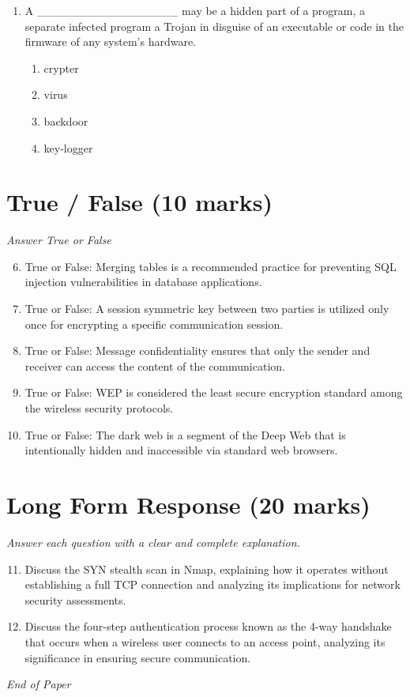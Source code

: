 \documentclass[12pt]{article}
\begin{document}
\begin{enumerate}[label=\arabic*.]
\begin{enumerate}[label=(\alph*)]
    \item buffer checks
\end{enumerate}
\item A \_\_\_\_\_\_\_\_\_\_\_\_\_\_\_\_\_ may be a hidden part of a program, a separate infected program a Trojan in disguise of an executable or code in the firmware of any system's hardware.
\begin{enumerate}[label=(\alph*)]
    \item crypter
    \item virus
    \item backdoor
    \item key-logger
\end{enumerate}
\end{enumerate}

\section*{True / False (10 marks)}
\textit{Answer True or False}
\begin{enumerate}[label=\arabic*.]
\setcounter{enumi}{5}
\item True or False: Merging tables is a recommended practice for preventing SQL injection vulnerabilities in database applications.
\item True or False: A session symmetric key between two parties is utilized only once for encrypting a specific communication session.
\item True or False: Message confidentiality ensures that only the sender and receiver can access the content of the communication.
\item True or False: WEP is considered the least secure encryption standard among the wireless security protocols.
\item True or False: The dark web is a segment of the Deep Web that is intentionally hidden and inaccessible via standard web browsers.
\end{enumerate}

\section*{Long Form Response (20 marks)}
\textit{Answer each question with a clear and complete explanation.}
\begin{enumerate}[label=\arabic*.]
\setcounter{enumi}{10}
\item Discuss the SYN stealth scan in Nmap, explaining how it operates without establishing a full TCP connection and analyzing its implications for network security assessments.
\item Discuss the four-step authentication process known as the 4-way handshake that occurs when a wireless user connects to an access point, analyzing its significance in ensuring secure communication.
\end{enumerate}

\vfill
\noindent\textit{End of Paper}
\end{document}
